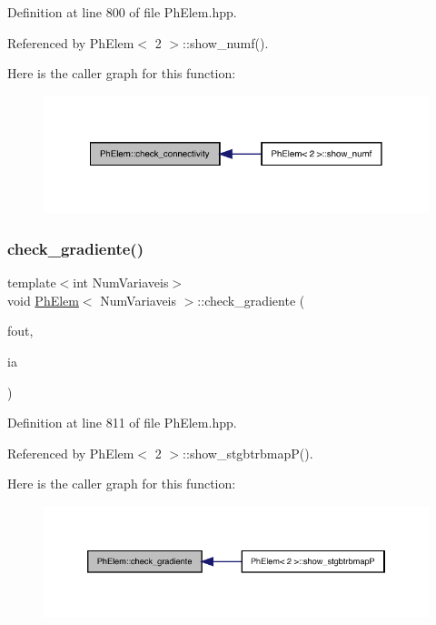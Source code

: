 Definition at line 800 of file Ph\+Elem.\+hpp.



Referenced by Ph\+Elem$<$ 2 $>$\+::show\+\_\+numf().

Here is the caller graph for this function\+:
\nopagebreak
\begin{figure}[H]
\begin{center}
\leavevmode
\includegraphics[width=328pt]{classPhElem_a76ba4a82c7f21f9a83808315903692fe_icgraph}
\end{center}
\end{figure}
\mbox{\label{classPhElem_a298b653fae7c86dea6ad0eea09b7e621}} 
\subsubsection{\texorpdfstring{check\+\_\+gradiente()}{check\_gradiente()}}
{\footnotesize\ttfamily template$<$int Num\+Variaveis$>$ \\
void \hyperlink{classPhElem}{Ph\+Elem}$<$ Num\+Variaveis $>$\+::check\+\_\+gradiente (\begin{DoxyParamCaption}\item[{F\+I\+LE $\ast$}]{fout,  }\item[{const int \&}]{ia }\end{DoxyParamCaption})}



Definition at line 811 of file Ph\+Elem.\+hpp.



Referenced by Ph\+Elem$<$ 2 $>$\+::show\+\_\+stgbtrbmap\+P().

Here is the caller graph for this function\+:
\nopagebreak
\begin{figure}[H]
\begin{center}
\leavevmode
\includegraphics[width=346pt]{classPhElem_a298b653fae7c86dea6ad0eea09b7e621_icgraph}
\end{center}
\end{figure}
\mbox{\label{classPhElem_a9ea744b94e057733c1d396d9f46ddcce}} 
